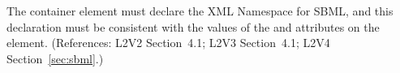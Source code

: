 The  container element must declare the XML Namespace
for SBML, and this declaration must be consistent with the values
of the  and  attributes on the 
 element.  (References: L2V2 Section~4.1;
L2V3 Section~4.1; L2V4 Section~\ref{sec:sbml}.)
